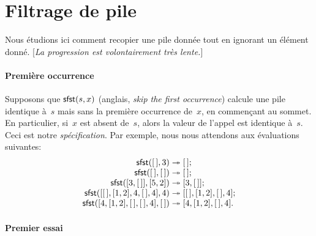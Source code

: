 \section{Filtrage de pile}
\label{sec:skipping}

Nous étudions ici comment recopier une pile donnée tout en ignorant un
élément donné. [\emph{La progression est volontairement très lente.}]

\paragraph{Première occurrence}
\label{def:linear_search}

Supposons que \(\textsf{sfst}(s,x)\) (anglais,
\emph{skip the first occurrence}) calcule une pile identique à~\(s\)
mais sans la première occurrence de~\(x\), en commençant au sommet. En
particulier, si~\(x\) est absent de~\(s\), alors la valeur de l'appel
est identique à~\(s\). Ceci est notre
\emph{spécification}. Par exemple, nous nous
attendons aux évaluations suivantes:\label{sfst_ex}
\begin{equation*}
\begin{array}{r@{\;}l@{\;}l}
\fun{sfst}(\el,3) & \twoheadrightarrow & \el;\\
\fun{sfst}(\el,\el) & \twoheadrightarrow & \el;\\
\fun{sfst}([3,\el],[5,2]) & \twoheadrightarrow & [3,\el];\\
\fun{sfst}([\el,[1,2],4,\el,4],4) & \twoheadrightarrow &
  [\el,[1,2],\el,4];\\
\fun{sfst}([4,[1,2],\el,\el,4],\el)
 & \twoheadrightarrow & [4,[1,2],\el,4].
\end{array}
\end{equation*}

\paragraph{Premier essai}

